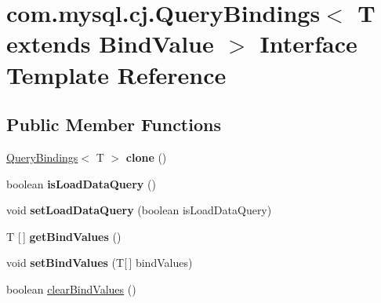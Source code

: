 \hypertarget{interfacecom_1_1mysql_1_1cj_1_1_query_bindings}{}\section{com.\+mysql.\+cj.\+Query\+Bindings$<$ T extends Bind\+Value $>$ Interface Template Reference}
\label{interfacecom_1_1mysql_1_1cj_1_1_query_bindings}
\subsection*{Public Member Functions}
\begin{DoxyCompactItemize}
\item 
\mbox{\label{interfacecom_1_1mysql_1_1cj_1_1_query_bindings_af95c1b74f5f636e02f47609fdbd58b05}} 
\mbox{\hyperlink{interfacecom_1_1mysql_1_1cj_1_1_query_bindings}{Query\+Bindings}}$<$ T $>$ {\bfseries clone} ()
\item 
\mbox{\label{interfacecom_1_1mysql_1_1cj_1_1_query_bindings_ae5c18c83c443b8f2372d4ef2c436ebfa}} 
boolean {\bfseries is\+Load\+Data\+Query} ()
\item 
\mbox{\label{interfacecom_1_1mysql_1_1cj_1_1_query_bindings_a89ba1ff9afcf80a0709f2dd28b8baf53}} 
void {\bfseries set\+Load\+Data\+Query} (boolean is\+Load\+Data\+Query)
\item 
\mbox{\label{interfacecom_1_1mysql_1_1cj_1_1_query_bindings_a7b42c528b1aa6e6223f34fbe70a331ef}} 
T \mbox{[}$\,$\mbox{]} {\bfseries get\+Bind\+Values} ()
\item 
\mbox{\label{interfacecom_1_1mysql_1_1cj_1_1_query_bindings_a1311e39a424947e23b0230c23402f788}} 
void {\bfseries set\+Bind\+Values} (T\mbox{[}$\,$\mbox{]} bind\+Values)
\item 
boolean \mbox{\hyperlink{interfacecom_1_1mysql_1_1cj_1_1_query_bindings_acd90572938fcce89fe68b9a3ba120372}{clear\+Bind\+Values}} ()
\item 
\mbox{\label{interfacecom_1_1mysql_1_1cj_1_1_query_bindings_a4413f6fc0016f5a9d571bb7e3460a974}} 

\end{DoxyCompactItemize}
